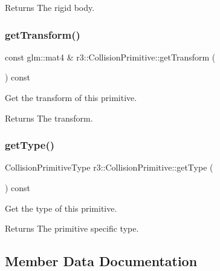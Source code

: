 \begin{DoxyReturn}{Returns}
The rigid body. 
\end{DoxyReturn}
\mbox{\label{classr3_1_1_collision_primitive_acc4e2139c698bab280338db36d7cc586}} 
\subsubsection{\texorpdfstring{get\+Transform()}{getTransform()}}
{\footnotesize\ttfamily const glm\+::mat4 \& r3\+::\+Collision\+Primitive\+::get\+Transform (\begin{DoxyParamCaption}{ }\end{DoxyParamCaption}) const}



Get the transform of this primitive. 

\begin{DoxyReturn}{Returns}
The transform. 
\end{DoxyReturn}
\mbox{\label{classr3_1_1_collision_primitive_ac7a318fb788d1442e7d3390c8e465e14}} 
\subsubsection{\texorpdfstring{get\+Type()}{getType()}}
{\footnotesize\ttfamily Collision\+Primitive\+Type r3\+::\+Collision\+Primitive\+::get\+Type (\begin{DoxyParamCaption}{ }\end{DoxyParamCaption}) const}



Get the type of this primitive. 

\begin{DoxyReturn}{Returns}
The primitive specific type. 
\end{DoxyReturn}


\subsection{Member Data Documentation}
\mbox{\label{classr3_1_1_collision_primitive_a3ae500c9bd222ec42d86696702e746db}} 
